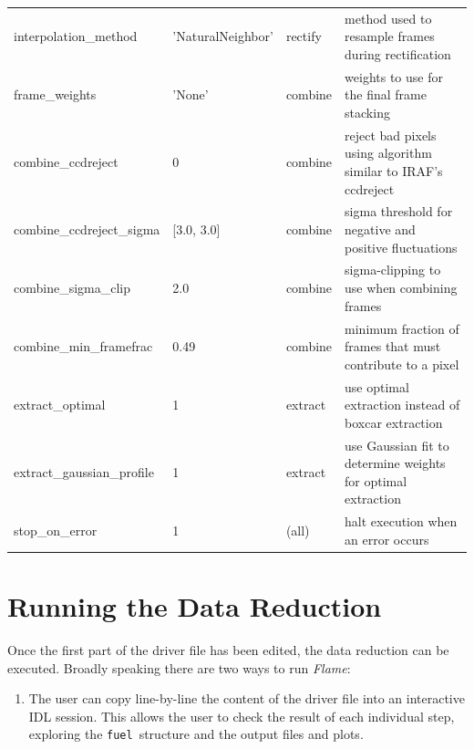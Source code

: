 \documentclass[a4paper]{article}
\newcommand{\flame}{\emph{Flame}}
\newcommand{\fuel}{\texttt{fuel}}
\begin{document}
\begin{sloppypar}
\begin{table}
{\begin{tabular}{llll}
    interpolation\_method         & 'NaturalNeighbor'  & rectify     & method used to resample frames during rectification \\
    frame\_weights                & 'None'        & combine          & weights to use for the final frame stacking \\
    combine\_ccdreject            & 0             & combine          & reject bad pixels using algorithm similar to IRAF's ccdreject \\
    combine\_ccdreject\_sigma     & [3.0, 3.0]    & combine          & sigma threshold for negative and positive fluctuations \\
    combine\_sigma\_clip          & 2.0           & combine          & sigma-clipping to use when combining frames \\
    combine\_min\_framefrac       & 0.49          & combine          & minimum fraction of frames that must contribute to a pixel \\
    extract\_optimal              & 1             & extract          & use optimal extraction instead of boxcar extraction \\
    extract\_gaussian\_profile    & 1             & extract          & use Gaussian fit to determine weights for optimal extraction \\
    stop\_on\_error               & 1             & (all)            & halt execution when an error occurs \\
    \hline
  \end{tabular}
  }
\end{table}







\section{Running the Data Reduction}
\label{sec:data_reduction}

Once the first part of the driver file has been edited, the data reduction can be executed. Broadly speaking there are two ways to run \flame:
\begin{enumerate}
\item The user can copy line-by-line the content of the driver file into an interactive IDL session. This allows the user to check the result of each individual step, exploring the \fuel\ structure and the output files and plots.


\end{enumerate}
\end{sloppypar}
\end{document}
